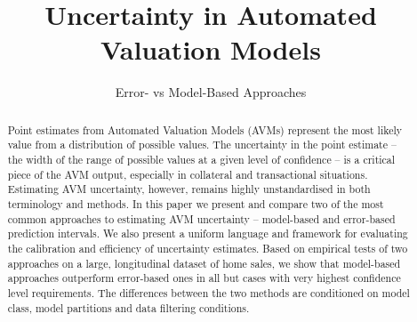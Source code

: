 \documentclass[colTwo]{anon}
\theoremstyle{definition}
\begin{document}

\title{Uncertainty in Automated Valuation Models}

\subtitle{Error- vs Model-Based Approaches}




\CCbY

\begin{abstracts}
\begin{abstract}
Point estimates from Automated Valuation Models (AVMs) represent the most likely value from a distribution of possible values. The uncertainty in the point estimate -- the width of the range of possible values at a given level of confidence -- is a critical piece of the AVM output, especially in collateral and transactional situations. Estimating AVM uncertainty, however, remains highly unstandardised in both terminology and methods. In this paper we present and compare two of the most common approaches to estimating AVM uncertainty -- model-based and error-based prediction intervals. We also present a uniform language and framework for evaluating the calibration and efficiency of uncertainty estimates. Based on empirical tests of two approaches on a large, longitudinal dataset of home sales, we show that model-based approaches outperform error-based ones in all but cases with very highest confidence level requirements. The differences between the two methods are conditioned on model class, model partitions and data filtering conditions.

\end{abstract}

\end{abstracts}

\maketitle
\end{document}
